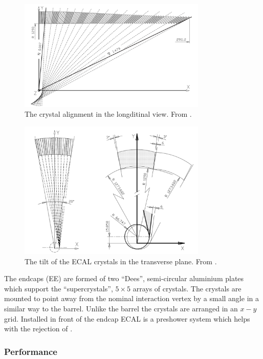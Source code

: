 \begin{figure}[htbp]
  \centering
  \includegraphics[width=0.8\textwidth]{crystallong}
  \caption{The crystal alignment in the longditinal view. From \cite{ecal1997technical}.}
  \label{fig:crystallong}
\end{figure}

\begin{figure}[htbp]
  \centering
  \includegraphics[width=0.8\textwidth]{crystaltilt}
  \caption{The tilt of the ECAL crystals in the transverse plane. From \cite{ecal1997technical}.}
  \label{fig:crystaltilt}
\end{figure}

The endcaps (EE) are formed of two ``Dees'', semi-circular aluminium plates
which support the ``supercrystals'', $5\times5$ arrays of crystals. The crystals are
mounted to point away from the nominal interaction vertex by a small angle in a similar way
to the barrel. 
Unlike the barrel the crystals are arranged in an $x-y$ grid.
Installed in front of the endcap ECAL is a preshower system which helps with
the rejection of \Ppizero \cite{chatrchyan2008cms}.

\subsubsection{Performance}

